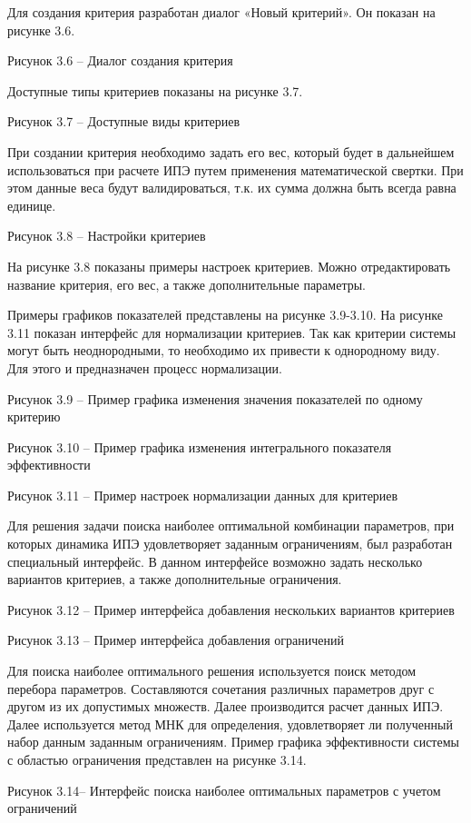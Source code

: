 Для создания критерия разработан диалог «Новый критерий». 
Он показан на рисунке 3.6.

 
Рисунок 3.6 – Диалог создания критерия

Доступные типы критериев показаны на рисунке 3.7.
 
Рисунок 3.7 – Доступные виды критериев

При создании критерия необходимо задать его вес, который будет в дальнейшем использоваться при расчете ИПЭ путем применения математической свертки.
При этом данные веса будут валидироваться, т.к. их сумма должна быть всегда равна единице.

Рисунок 3.8 – Настройки критериев

На рисунке 3.8 показаны примеры настроек критериев. 
Можно отредактировать название критерия, его вес, а также дополнительные параметры.

Примеры графиков показателей представлены на рисунке 3.9-3.10.
На рисунке 3.11 показан интерфейс для нормализации критериев. 
Так как критерии системы могут быть неоднородными, то необходимо их привести к однородному виду. 
Для этого и предназначен процесс нормализации. 


Рисунок 3.9 – Пример графика изменения значения показателей по одному критерию

Рисунок 3.10 – Пример графика изменения интегрального показателя эффективности

Рисунок 3.11 – Пример настроек нормализации данных для критериев

Для решения задачи поиска наиболее оптимальной комбинации параметров, при которых динамика ИПЭ удовлетворяет заданным ограничениям, был разработан специальный интерфейс. 
В данном интерфейсе возможно задать несколько вариантов критериев, а также дополнительные ограничения.

Рисунок 3.12 – Пример интерфейса добавления нескольких вариантов критериев

Рисунок 3.13 – Пример интерфейса добавления ограничений

Для поиска наиболее оптимального решения используется поиск методом перебора параметров. 
Составляются сочетания различных параметров друг с другом из их допустимых множеств. 
Далее производится расчет данных ИПЭ. Далее используется метод МНК для определения, удовлетворяет ли полученный набор данным заданным ограничениям.
Пример графика эффективности системы с областью ограничения представлен на рисунке 3.14.

Рисунок 3.14– Интерфейс поиска наиболее оптимальных параметров с учетом ограничений

